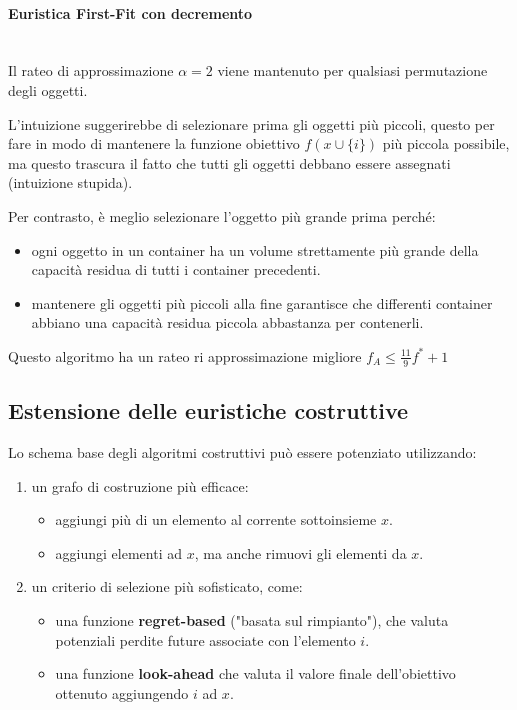 \documentclass{article}
\begin{document}
\paragraph{Euristica First-Fit con decremento}\mbox{}\\
Il rateo di approssimazione $\alpha =2$ viene mantenuto per qualsiasi permutazione degli
oggetti.

L'intuizione suggerirebbe di selezionare prima gli oggetti più piccoli, questo per fare in
modo di mantenere la funzione obiettivo $f(x\cup\{i\})$ più piccola possibile, ma questo
trascura il fatto che tutti gli oggetti debbano essere assegnati (intuizione stupida).

Per contrasto, è meglio selezionare l'oggetto più grande prima perché:
\begin{itemize}
    \item ogni oggetto in un container ha un volume strettamente più grande
          della capacità residua di tutti i container precedenti.
    \item mantenere gli oggetti più piccoli alla fine garantisce che differenti
          container abbiano una capacità residua piccola abbastanza per contenerli.
\end{itemize}
Questo algoritmo ha un rateo ri approssimazione migliore $f_A\leq \frac{11}{9}f^*+1$

\subsection{Estensione delle euristiche costruttive}
Lo schema base degli algoritmi costruttivi può essere potenziato utilizzando:
\begin{enumerate}
    \item un grafo di costruzione più efficace:
          \begin{itemize}
              \item aggiungi più di un elemento al corrente sottoinsieme $x$.
              \item aggiungi elementi ad $x$, ma anche rimuovi gli elementi da $x$.
          \end{itemize}

    \item un criterio di selezione più sofisticato, come:
          \begin{itemize}
              \item una funzione \textbf{regret-based} ("basata sul rimpianto"), che
                    valuta potenziali perdite future associate con l'elemento $i$.
              \item una funzione \textbf{look-ahead} che valuta il valore finale dell'obiettivo
                    ottenuto aggiungendo $i$ ad $x$.
          \end{itemize}
\end{enumerate}
\end{document}

